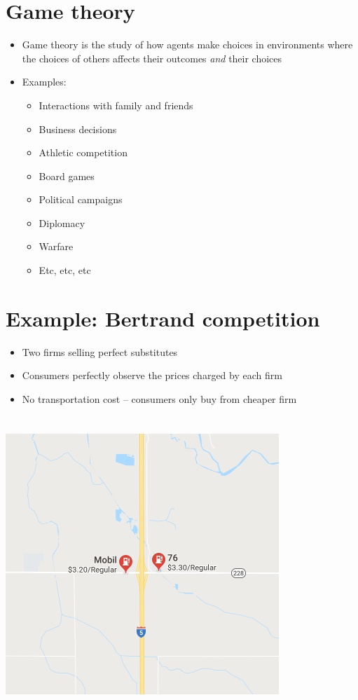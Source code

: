 \documentclass[11pt]{article}
\begin{document}
\section*{Game theory}
\label{sec:orge12571a}
\begin{itemize}
\item Game theory is the study of how agents make choices in environments where the choices of others affects their outcomes \emph{and} their choices
\item Examples:
\begin{itemize}
\item Interactions with family and friends
\item Business decisions
\item Athletic competition
\item Board games
\item Political campaigns
\item Diplomacy
\item Warfare
\item Etc, etc, etc
\end{itemize}
\end{itemize}
\section*{Example: Bertrand competition}
\label{sec:orgc628d09}
\begin{itemize}
\item Two firms selling perfect substitutes
\item Consumers perfectly observe the prices charged by each firm
\item No transportation cost -- consumers only buy from cheaper firm
\end{itemize}
\section*{}
\label{sec:org29f07fa}
\begin{center}
\includegraphics[height=.5\textwidth]{./img/gas.png}
\end{center}
\end{document}
